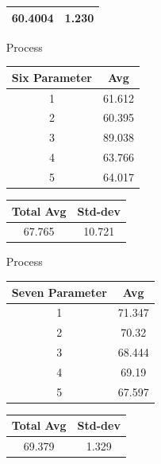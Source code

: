 \begin{enumerate}
\begin{center}
\begin{tabular}{||c c||}
                 \hline\hline
                 60.4004 & 1.230\\ 
                 \hline
                \hline
            \end{tabular}
        \end{center}
        \item [Process]
        \begin{center}
            \begin{tabular}{||c c||} 
             \hline
             Six Parameter & Avg \\ [0.5ex] 
             \hline\hline
             1 & 61.612  \\ 
             \hline
             2 & 60.395  \\ 
             \hline
             3 & 89.038  \\ 
             \hline
             4 & 63.766 \\ 
             \hline
             5 & 64.017  \\ 
             \hline
             \hline
            \end{tabular}
                                        \begin{tabular}{||c c||} 
                 \hline
                 Total Avg & Std-dev \\ [0.5ex] 
                 \hline\hline
                 67.765 & 10.721\\ 
                 \hline
                \hline
            \end{tabular}
        \end{center}
        \item [Process]
        \begin{center}
            \begin{tabular}{||c c||} 
             \hline
             Seven Parameter & Avg \\ [0.5ex] 
             \hline\hline
             1 & 71.347  \\ 
             \hline
             2 & 70.32 \\ 
             \hline
             3 & 68.444  \\ 
             \hline
             4 & 69.19 \\ 
             \hline
             5 & 67.597  \\ 
             \hline
             \hline
            \end{tabular}
                            \begin{tabular}{||c c||} 
                 \hline
                 Total Avg & Std-dev \\ [0.5ex] 
                 \hline\hline
                 69.379 & 1.329\\ 
                 \hline
                \hline
            \end{tabular}
        \end{center}
\end{enumerate}

